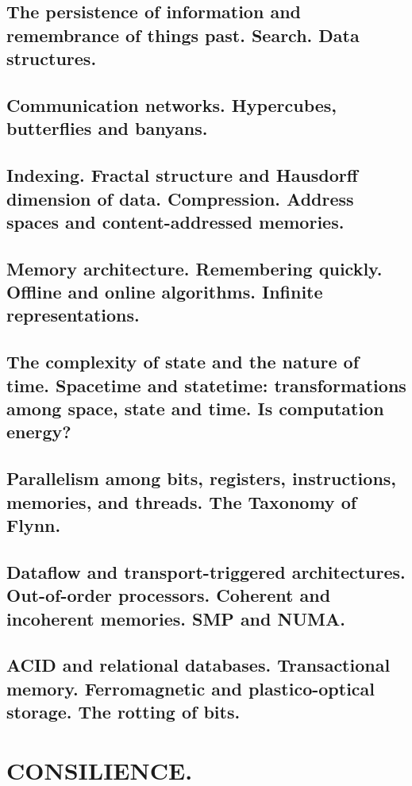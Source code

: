 \documentclass[letterpaper,draft]{memoir}
\begin{document}
\chapter{The persistence of information and remembrance of things past. Search. Data structures.}

\chapter{Communication networks. Hypercubes, butterflies and banyans.}

\chapter{Indexing. Fractal structure and Hausdorff dimension of data. Compression.
Address spaces and content-addressed memories.}

\chapter{Memory architecture. Remembering quickly. Offline and online algorithms.
Infinite representations.}

\chapter{The complexity of state and the nature of time. Spacetime and statetime:
transformations among space, state and time. Is computation energy?}

\chapter{Parallelism among bits, registers, instructions, memories, and threads. The
Taxonomy of Flynn.}

\chapter{Dataflow and transport-triggered architectures. Out-of-order processors.
Coherent and incoherent memories. SMP and NUMA.}

\chapter{ACID and relational databases. Transactional memory. Ferromagnetic and
plastico-optical storage. The rotting of bits.}

\part{CONSILIENCE.}
\end{document}
